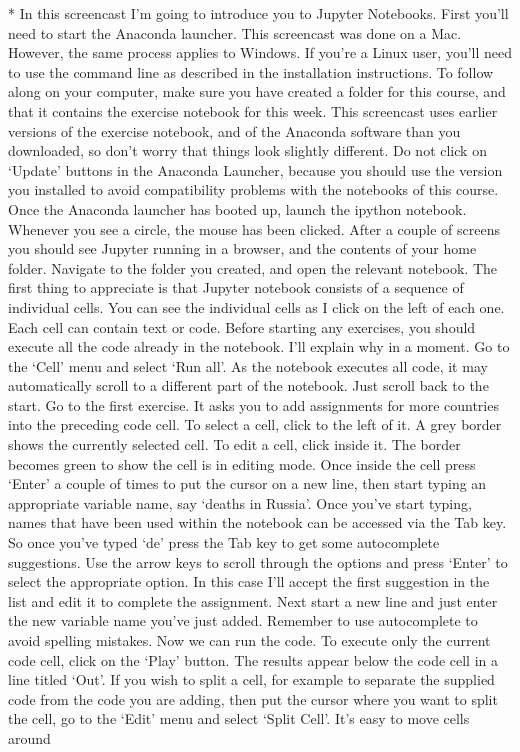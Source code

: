 \documentclass[letterpaper,10pt,english]{sphinxmanual}
\begin{document}
 * In this screencast I’m going to introduce you to Jupyter Notebooks. First you’ll need to start the Anaconda launcher. This screencast was done on a Mac. However, the same process applies to Windows. If you’re a Linux user, you’ll need to use the command line as described in the installation instructions. To follow along on your computer, make sure you have created a folder for this course, and that it contains the exercise notebook for this week. This screencast uses earlier
versions of the exercise notebook, and of the Anaconda software than you downloaded, so don’t worry that things look slightly different. \sphinxstyleemphasis{;} Do not click on ‘Update’ buttons in the Anaconda Launcher, because you should use the version you installed to avoid compatibility problems with the notebooks of this course. Once the Anaconda launcher has booted up, launch the ipython notebook. Whenever you see a circle, the mouse has been clicked. After a couple of screens you should see Jupyter running
in a browser, and the contents of your home folder. Navigate to the folder you created, and open the relevant notebook. The first thing to appreciate is that Jupyter notebook consists of a sequence of individual cells. You can see the individual cells as I click on the left of each one. Each cell can contain text or code. \sphinxstyleemphasis{;} Before starting any exercises, you should execute all the code already in the notebook. I’ll explain why in a moment. Go to the ‘Cell’ menu and select ‘Run all’. As the
notebook executes all code, it may automatically scroll to a different part of the notebook. Just scroll back to the start. Go to the first exercise. It asks you to add assignments for more countries into the preceding code cell. To select a cell, click to the left of it. A grey border shows the currently selected cell. To edit a cell, click inside it. The border becomes green to show the cell is in editing mode. \sphinxstyleemphasis{;} Once inside the cell press ‘Enter’ a couple of times to put the cursor on a new
line, then start typing an appropriate variable name, say ‘deaths in Russia’. Once you’ve start typing, names that have been used within the notebook can be accessed via the Tab key. So once you’ve typed ‘de’ press the Tab key to get some auto\sphinxhyphen{}complete suggestions. Use the arrow keys to scroll through the options and press ‘Enter’ to select the appropriate option. In this case I’ll accept the first suggestion in the list and edit it to complete the assignment. Next start a new line and just
enter the new variable name you’ve just added. Remember to use auto\sphinxhyphen{}complete to avoid spelling mistakes. \sphinxstyleemphasis{;} Now we can run the code. To execute only the current code cell, click on the ‘Play’ button. The results appear below the code cell in a line titled ‘Out’. If you wish to split a cell, for example to separate the supplied code from the code you are adding, then put the cursor where you want to split the cell, go to the ‘Edit’ menu and select ‘Split Cell’. It’s easy to move cells around \sphinxhyphen{}
\end{document}
